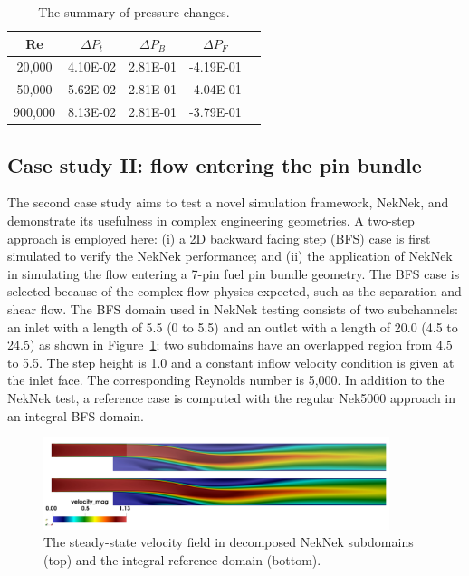 \begin{table} \centering \small
 \begin{tabular}{ccccc} \hline \hline
   Re        & $\Delta P_t$   & $\Delta P_B$  & $\Delta P_F$  \\ \hline
   20,000    & 4.10E-02       & 2.81E-01      & -4.19E-01  \\
   50,000    & 5.62E-02       & 2.81E-01      & -4.04E-01  \\
   900,000   & 8.13E-02       & 2.81E-01      & -3.79E-01  \\
   \hline \hline
\end{tabular}
 \caption{The summary of pressure changes.}
 \label{tab:full core}
\end{table}



\subsection{Case study II: flow entering the pin bundle}
\label{sec:results2}

The second case study aims to test a novel simulation framework, NekNek, and demonstrate its usefulness in complex engineering geometries.
A two-step approach is employed here: (i) a 2D backward facing step (BFS) case is first simulated to verify the NekNek performance; and (ii) the application of NekNek in simulating the flow entering a 7-pin fuel pin bundle geometry.
The BFS case is selected because of the complex flow physics expected, such as the separation and shear flow.
The BFS domain used in NekNek testing consists of two subchannels: an inlet with a length of 5.5 (0 to 5.5) and an outlet with a length of 20.0 (4.5 to 24.5) as shown in Figure~\ref{fig:bfs_domain}; two subdomains have an overlapped region from 4.5 to 5.5.
The step height is 1.0 and a constant inflow velocity condition is given at the inlet face.
The corresponding Reynolds number is 5,000.
In addition to the NekNek test, a reference case is computed with the regular Nek5000 approach in an integral BFS domain.


\begin{figure}[!ht]
\centering
\includegraphics[width=0.9\textwidth]{./figures/bfs_vel.png}
\caption{The steady-state velocity field in decomposed NekNek subdomains (top) and the integral reference domain (bottom). }
\label{fig:bfs_domain}
\end{figure}


